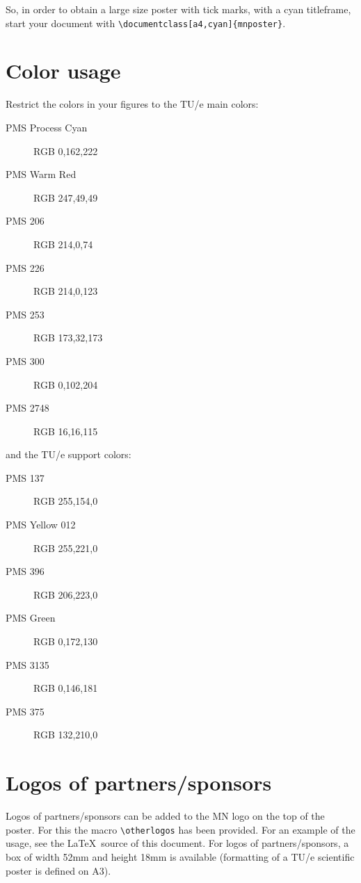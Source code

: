 \documentclass[a0,red]{opacpstr}
\begin{document}
\begin{multicols}{3}
So, in order to obtain a large size poster with tick marks, with a cyan
titleframe, start your document with
\verb=\documentclass[a4,cyan]{mnposter}=.


\section{Color usage}
Restrict the colors in your figures to the TU/e main colors:
\begin{description}
\item[PMS Process Cyan] \colorbox{tuepmsprocesscyan}{RGB 0,162,222}
\item[PMS Warm Red] \colorbox{tuepmswarmred}{RGB 247,49,49}
\item[PMS 206] \colorbox{tuepms206}{RGB 214,0,74}
\item[PMS 226] \colorbox{tuepms226}{RGB 214,0,123}
\item[PMS 253] \colorbox{tuepms253}{RGB 173,32,173}
\item[PMS 300] \colorbox{tuepms300}{RGB 0,102,204}
\item[PMS 2748] \colorbox{tuepms2748}{RGB 16,16,115}
\end{description}
and the TU/e support colors:
\begin{description}
\item[PMS 137] \colorbox{tuepms137}{RGB 255,154,0}
\item[PMS Yellow 012] \colorbox{tuepmsyellow012}{RGB 255,221,0}
\item[PMS 396] \colorbox{tuepms396}{RGB 206,223,0}
\item[PMS Green] \colorbox{tuepmsgreen}{RGB 0,172,130}
\item[PMS 3135] \colorbox{tuepms3135}{RGB 0,146,181}
\item[PMS 375] \colorbox{tuepms375}{RGB 132,210,0}
\end{description}

\end{multicols}

\iffalse
\section{Logos of partners/sponsors}
Logos of partners/sponsors can be added to the MN logo on the top of the
poster. For this the macro \verb=\otherlogos= has been provided. For an
example of the usage, see the \LaTeX\ source of this document. For logos of
partners/sponsors, a box of width 52mm and height 18mm is available (formatting
of a TU/e scientific poster is defined on A3).
\end{document}
